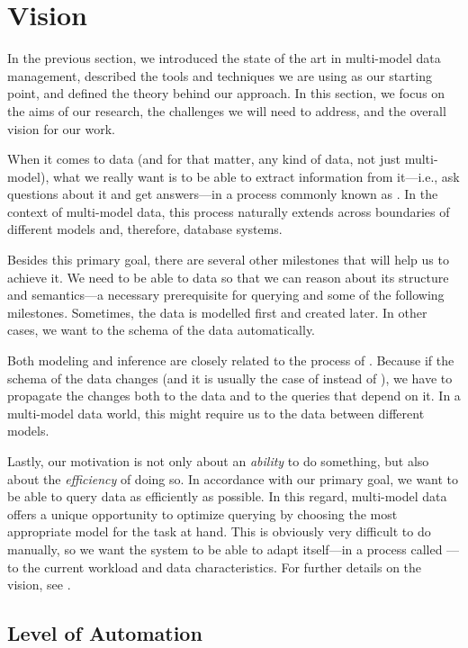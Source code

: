 \section{Vision}

In the previous section, we introduced the state of the art in multi-model data management, described the tools and techniques we are using as our starting point, and defined the theory behind our approach. In this section, we focus on the aims of our research, the challenges we will need to address, and the overall vision for our work.

When it comes to data (and for that matter, any kind of data, not just multi-model), what we really want is to be able to extract information from it---i.e., ask questions about it and get answers---in a process commonly known as . In the context of multi-model data, this process naturally extends across boundaries of different models and, therefore, database systems.

Besides this primary goal, there are several other milestones that will help us to achieve it. We need to be able to  data so that we can reason about its structure and semantics---a necessary prerequisite for querying and some of the following milestones. Sometimes, the data is modelled first and created later. In other cases, we want to  the schema of the data automatically.

Both modeling and inference are closely related to the process of . Because if the schema of the data changes (and it is usually the case of  instead of ), we have to propagate the changes both to the data and to the queries that depend on it. In a multi-model data world, this might require us to  the data between different models.

Lastly, our motivation is not only about an \emph{ability} to do something, but also about the \emph{efficiency} of doing so. In accordance with our primary goal, we want to be able to query data as efficiently as possible. In this regard, multi-model data offers a unique opportunity to optimize querying by choosing the most appropriate model for the task at hand. This is obviously very difficult to do manually, so we want the system to be able to adapt itself---in a process called ---to the current workload and data characteristics. For further details on the vision, see .

\subsection{Level of Automation}

\citep{ideas2022vision}
